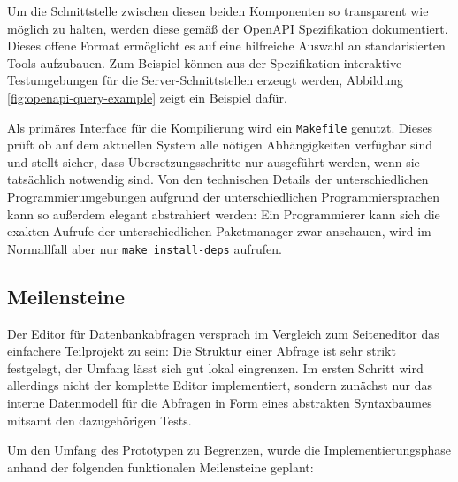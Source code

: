 Um die Schnittstelle zwischen diesen beiden Komponenten so transparent wie möglich zu halten, werden diese gemäß der OpenAPI Spezifikation \cite{open-api} dokumentiert. Dieses offene Format ermöglicht es auf eine hilfreiche Auswahl an standarisierten Tools aufzubauen. Zum Beispiel können aus der Spezifikation interaktive Testumgebungen für die Server-Schnittstellen erzeugt werden, Abbildung \ref{fig:openapi-query-example} zeigt ein Beispiel dafür.

Als primäres Interface für die Kompilierung wird ein \lstinline{Makefile} genutzt. Dieses prüft ob auf dem aktuellen System alle nötigen Abhängigkeiten verfügbar sind und stellt sicher, dass Übersetzungsschritte nur ausgeführt werden, wenn sie tatsächlich notwendig sind. Von den technischen Details der unterschiedlichen Programmierumgebungen aufgrund der unterschiedlichen Programmiersprachen kann so außerdem elegant abstrahiert werden: Ein Programmierer kann sich die exakten Aufrufe der unterschiedlichen Paketmanager zwar anschauen, wird im Normallfall aber nur \texttt{make install-deps} aufrufen.

\subsection{Meilensteine}

Der Editor für Datenbankabfragen versprach im Vergleich zum Seiteneditor das einfachere Teilprojekt zu sein: Die Struktur einer Abfrage ist sehr strikt festgelegt, der Umfang lässt sich gut lokal eingrenzen. Im ersten Schritt wird allerdings nicht der komplette Editor implementiert, sondern zunächst nur das interne Datenmodell für die Abfragen in Form eines abstrakten Syntaxbaumes mitsamt den dazugehörigen Tests.

Um den Umfang des Prototypen zu Begrenzen, wurde die Implementierungsphase anhand der folgenden funktionalen Meilensteine geplant:

